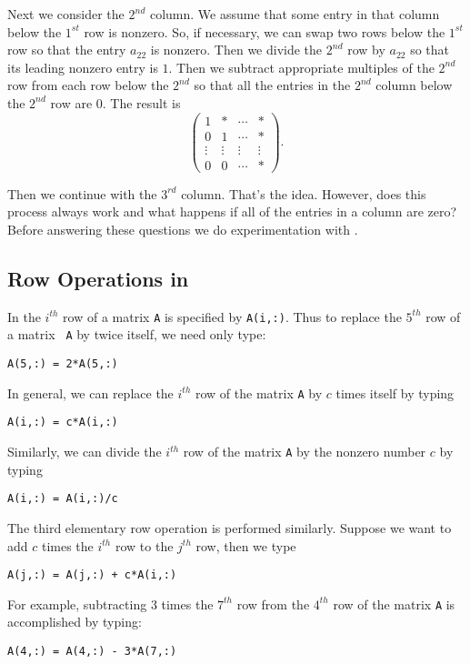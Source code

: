 \documentclass{ximera}
\begin{document}
Next we consider the $2^{nd}$ column.  We assume that some entry
in that column below the $1^{st}$ row is nonzero.  So, if
necessary, we can swap two rows below the $1^{st}$ row so
that the entry $a_{22}$ is nonzero.  Then we divide the $2^{nd}$
row by $a_{22}$ so that its leading nonzero entry is $1$.  Then
we subtract appropriate multiples of the $2^{nd}$ row from each
row below the $2^{nd}$ so that all the entries in the $2^{nd}$
column below the $2^{nd}$ row are $0$.  The result is
\[
\left(\begin{array}{cccc}  1 & * & \cdots & * \\
0 & 1 & \cdots & * \\ \vdots & \vdots & \vdots & \vdots \\
0 & 0 & \cdots & * \end{array} \right).
\]

Then we continue with the $3^{rd}$ column.  That's the idea.  However,
does this process always work and what happens if all of the entries
in a column are zero?  Before answering these questions we do
experimentation with \Matlabp.

\subsection*{Row Operations in \Matlab}

In \Matlab the $i^{th}$ row of a matrix {\tt A} is specified by
{\tt A(i,:)}.  Thus to replace the $5^{th}$ row of a matrix {\tt
A} by twice itself, we need only type:
\begin{verbatim}
A(5,:) = 2*A(5,:)
\end{verbatim}
In general, we can replace the $i^{th}$ row of the matrix
{\tt A} by $c$ times itself by typing
\begin{verbatim}
A(i,:) = c*A(i,:)
\end{verbatim}
Similarly, we can divide the $i^{th}$ row of the matrix {\tt A}
by the nonzero number $c$ by typing
\begin{verbatim}
A(i,:) = A(i,:)/c
\end{verbatim}

The third elementary row operation is performed similarly.
Suppose we want to add $c$ times the $i^{th}$ row to the
$j^{th}$ row, then we type
\begin{verbatim}
A(j,:) = A(j,:) + c*A(i,:)
\end{verbatim}
For example, subtracting $3$ times the $7^{th}$ row from the
$4^{th}$ row of the matrix {\tt A} is accomplished by typing:
\begin{verbatim}
A(4,:) = A(4,:) - 3*A(7,:)
\end{verbatim}
\end{document}
